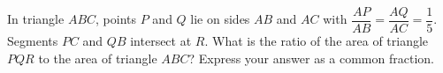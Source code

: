 In triangle $ABC$, points $P$ and $Q$ lie on sides $AB$ and $AC$ with $\dfrac{AP}{AB}=\dfrac{AQ}{AC}=\dfrac15$. Segments $PC$ and $QB$ intersect at $R$. What is the ratio of the area of triangle $PQR$ to the area of triangle $ABC$? Express your answer as a common fraction.

